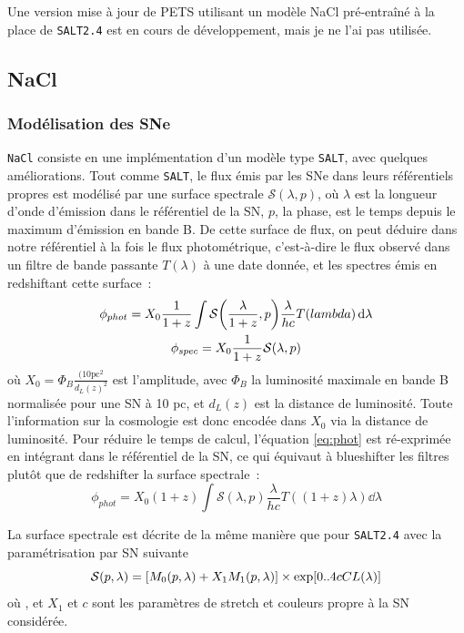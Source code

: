 \documentclass{book}
\let\mcl\mathcal
\begin{document}
Une version mise à jour de PETS utilisant un modèle NaCl pré-entraîné à la place de \verb|SALT2.4| est en cours de développement, mais je ne l'ai pas utilisée.


\subsection{NaCl}

\subsubsection{Modélisation des SNe}

\verb|NaCl| consiste en une implémentation d'un modèle type \verb|SALT|, avec quelques améliorations. Tout comme \verb|SALT|, le flux émis par les SNe dans leurs référentiels propres est modélisé par une surface spectrale $\mcl S(\lambda, p)$, où $\lambda$ est la longueur d'onde d'émission dans le référentiel de la SN, $p$, la phase, est le temps depuis le maximum d'émission en bande B.
De cette surface de flux, on peut déduire dans notre référentiel à la fois le flux photométrique, c'est-à-dire le flux observé dans un filtre de bande passante $T(\lambda)$ à une date donnée, et les spectres émis en redshiftant cette surface~:
\begin{gather}
	\phi_{phot} = X_0 \frac{1}{1+z} \int \mcl S\qty(\frac{\lambda}{1+z}, p) \frac{\lambda}{hc} T(lambda) \dd{\lambda} \label{eq:phot}\\
	\phi_{spec}  = X_0 \frac{1}{1+z} \mcl S(\lambda, p) \label{eq:spec}
\end{gather}
où $X_0 = \Phi_B \frac{(10\text{pc}^2}{d_L(z)^2}$ est l'amplitude, avec $\Phi_B$ la luminosité maximale en bande B normalisée pour une SN à 10 pc, et $d_L(z)$ est la distance de luminosité. Toute l'information sur la cosmologie est donc encodée dans $X_0$ via la distance de luminosité.
Pour réduire le temps de calcul, l'équation \ref{eq:phot} est ré-exprimée en intégrant dans le référentiel de la SN, ce qui équivaut à blueshifter les filtres plutôt que de redshifter la surface spectrale~:
\begin{equation}
	\phi_{phot} = X_0 (1+z) \int \mcl S(\lambda, p) \frac{\lambda}{hc} T((1+z)\lambda) \dd{\lambda}
\end{equation}

La surface spectrale est décrite de la même manière que pour \verb|SALT2.4| avec la paramétrisation par SN suivante
\begin{equation}
    \mcl S (p, \lambda) = \qty[M_0(p, \lambda) + X_1 M_1(p, \lambda)] \times \exp[0..4 c CL(\lambda)]
\end{equation}
où , et $X_1$ et $c$ sont les paramètres de stretch et couleurs propre à la SN considérée.
\end{document}
